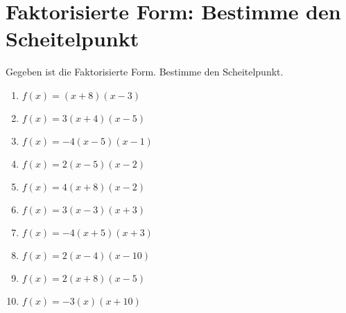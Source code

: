 \documentclass{article}%
\begin{document}
\section{Faktorisierte Form: Bestimme den Scheitelpunkt}%
\label{sec:FaktorisierteFormBestimmedenScheitelpunkt}%
Gegeben ist die Faktorisierte Form. Bestimme den Scheitelpunkt.%
\begin{enumerate}[label=\alph*)]%
\item%
\newline\vspace{0.5cm} $f(x)=(x+8)(x-3)$%
\item%
\newline\vspace{0.5cm} $f(x)=3(x+4)(x-5)$%
\item%
\newline\vspace{0.5cm} $f(x)=-4(x-5)(x-1)$%
\item%
\newline\vspace{0.5cm} $f(x)=2(x-5)(x-2)$%
\item%
\newline\vspace{0.5cm} $f(x)=4(x+8)(x-2)$%
\item%
\newline\vspace{0.5cm} $f(x)=3(x-3)(x+3)$%
\item%
\newline\vspace{0.5cm} $f(x)=-4(x+5)(x+3)$%
\item%
\newline\vspace{0.5cm} $f(x)=2(x-4)(x-10)$%
\item%
\newline\vspace{0.5cm} $f(x)=2(x+8)(x-5)$%
\item%
\newline\vspace{0.5cm} $f(x)=-3(x)(x+10)$%
\end{enumerate}

%
\end{document}
